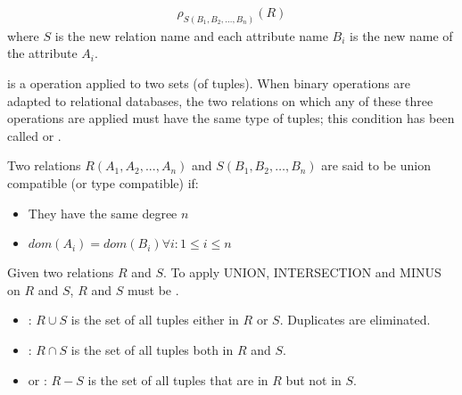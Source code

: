       \begin{align*}
        \rho_{S(B_1, B_2, \ldots, B_n)}(R)
      \end{align*}
      where $S$ is the new relation name and each attribute name $B_i$ is the new name of the attribute $A_i$.


      \par {} is a operation applied to two sets (of tuples). When binary operations are adapted to relational databases, the two relations on which any of these three operations are applied must have the same type of tuples; this condition has been called  or .

      \par Two relations $R(A_1, A_2, ..., A_n)$ and $S(B_1 , B_2, \ldots, B_n)$ are said to be union compatible (or type compatible) if:

      \begin{itemize}
        \item They have the same degree $n$
        \item $dom(A_i) = dom(B_i) \forall i: 1 \leq i \leq n$
      \end{itemize}

      \par Given two relations $R$ and $S$. To apply UNION, INTERSECTION and MINUS on $R$ and $S$, $R$ and $S$ must be .

      \begin{itemize}
        \item {}: $R \cup S$ is the set of all tuples either in $R$ or $S$. Duplicates are eliminated.
        \item {}: $R \cap S$ is the set of all tuples both in $R$ and $S$.
        \item {} or : $R - S$ is the set of all tuples that are in $R$ but not in $S$.
      \end{itemize}

